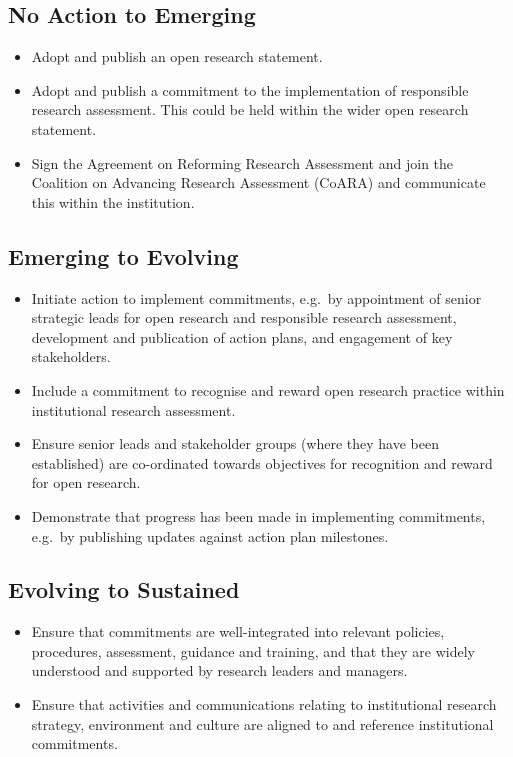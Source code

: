 \documentclass[
  letterpaper,
  DIV=11,
  numbers=noendperiod,
  oneside]{scrreprt}
\begin{document}
\subsection{No Action to Emerging}\label{no-action-to-emerging}

\begin{itemize}
\item
  Adopt and publish an open research statement.
\item
  Adopt and publish a commitment to the implementation of responsible
  research assessment. This could be held within the wider open research
  statement.
\item
  Sign the Agreement on Reforming Research Assessment and join the
  Coalition on Advancing Research Assessment (CoARA) and communicate
  this within the institution.
\end{itemize}

\subsection{Emerging to Evolving}\label{emerging-to-evolving}

\begin{itemize}
\item
  Initiate action to implement commitments, e.g.~by appointment of
  senior strategic leads for open research and responsible research
  assessment, development and publication of action plans, and
  engagement of key stakeholders.
\item
  Include a commitment to recognise and reward open research practice
  within institutional research assessment.
\item
  Ensure senior leads and stakeholder groups (where they have been
  established) are co-ordinated towards objectives for recognition and
  reward for open research.
\item
  Demonstrate that progress has been made in implementing commitments,
  e.g.~by publishing updates against action plan milestones.
\end{itemize}

\subsection{Evolving to Sustained}\label{evolving-to-sustained}

\begin{itemize}
\item
  Ensure that commitments are well-integrated into relevant policies,
  procedures, assessment, guidance and training, and that they are
  widely understood and supported by research leaders and managers.
\item
  Ensure that activities and communications relating to institutional
  research strategy, environment and culture are aligned to and
  reference institutional commitments.
\end{itemize}
\end{document}
